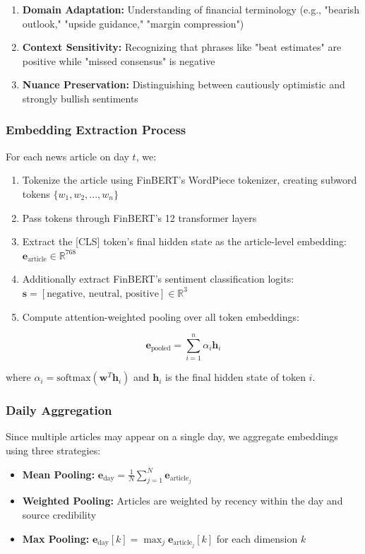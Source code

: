 \documentclass[conference]{IEEEtran}
\begin{document}
\begin{enumerate}
\item \textbf{Domain Adaptation:} Understanding of financial terminology (e.g., "bearish outlook," "upside guidance," "margin compression")
\item \textbf{Context Sensitivity:} Recognizing that phrases like "beat estimates" are positive while "missed consensus" is negative
\item \textbf{Nuance Preservation:} Distinguishing between cautiously optimistic and strongly bullish sentiments
\end{enumerate}

\subsubsection{Embedding Extraction Process}
For each news article on day $t$, we:

\begin{enumerate}
\item Tokenize the article using FinBERT's WordPiece tokenizer, creating subword tokens $\{w_1, w_2, ..., w_n\}$
\item Pass tokens through FinBERT's 12 transformer layers
\item Extract the [CLS] token's final hidden state as the article-level embedding: $\mathbf{e}_{\text{article}} \in \mathbb{R}^{768}$
\item Additionally extract FinBERT's sentiment classification logits: $\mathbf{s} = [\text{negative, neutral, positive}] \in \mathbb{R}^3$
\item Compute attention-weighted pooling over all token embeddings:
\end{enumerate}

\begin{equation}
\mathbf{e}_{\text{pooled}} = \sum_{i=1}^{n} \alpha_i \mathbf{h}_i
\end{equation}

where $\alpha_i = \text{softmax}(\mathbf{w}^T \mathbf{h}_i)$ and $\mathbf{h}_i$ is the final hidden state of token $i$.

\subsubsection{Daily Aggregation}
Since multiple articles may appear on a single day, we aggregate embeddings using three strategies:

\begin{itemize}
\item \textbf{Mean Pooling:} $\mathbf{e}_{\text{day}} = \frac{1}{N} \sum_{j=1}^{N} \mathbf{e}_{\text{article}_j}$
\item \textbf{Weighted Pooling:} Articles are weighted by recency within the day and source credibility
\item \textbf{Max Pooling:} $\mathbf{e}_{\text{day}}[k] = \max_j \mathbf{e}_{\text{article}_j}[k]$ for each dimension $k$
\end{itemize}
\end{document}
